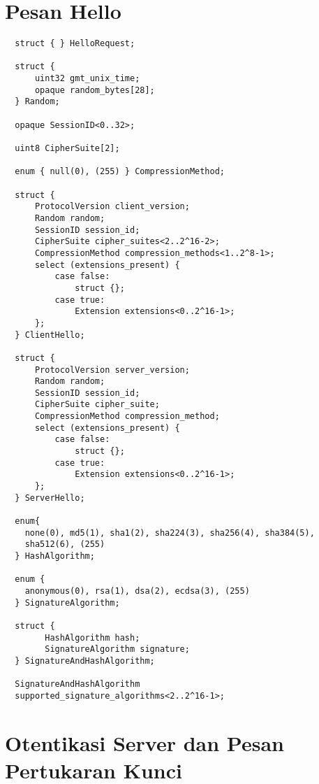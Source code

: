 \section{Pesan Hello}

\begin{verbatim}
  struct { } HelloRequest;

  struct {
      uint32 gmt_unix_time;
      opaque random_bytes[28];
  } Random;

  opaque SessionID<0..32>;

  uint8 CipherSuite[2];

  enum { null(0), (255) } CompressionMethod;

  struct {
      ProtocolVersion client_version;
      Random random;
      SessionID session_id;
      CipherSuite cipher_suites<2..2^16-2>;
      CompressionMethod compression_methods<1..2^8-1>;
      select (extensions_present) {
          case false:
              struct {};
          case true:
              Extension extensions<0..2^16-1>;
      };
  } ClientHello;

  struct {
      ProtocolVersion server_version;
      Random random;
      SessionID session_id;
      CipherSuite cipher_suite;
      CompressionMethod compression_method;
      select (extensions_present) {
          case false:
              struct {};
          case true:
              Extension extensions<0..2^16-1>;
      };
  } ServerHello;

  enum{
    none(0), md5(1), sha1(2), sha224(3), sha256(4), sha384(5),
    sha512(6), (255)
  } HashAlgorithm;

  enum {
    anonymous(0), rsa(1), dsa(2), ecdsa(3), (255)
  } SignatureAlgorithm;

  struct {
        HashAlgorithm hash;
        SignatureAlgorithm signature;
  } SignatureAndHashAlgorithm;

  SignatureAndHashAlgorithm
  supported_signature_algorithms<2..2^16-1>;
\end{verbatim}

\section{Otentikasi Server dan Pesan Pertukaran Kunci}

